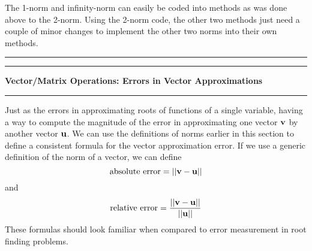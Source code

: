 \documentclass[10pt,fleqn]{article}
\begin{document}
The 1-norm and infinity-norm can easily be coded into methods as was done above
to the 2-norm. Using the 2-norm code, the other two methods just need a couple
of minor changes to implement the other two norms into their own methods.
\vskip0.1in\hrule\vskip0.1in
\newpage
\vskip0.1in\hrule\vskip0.1in
\noindent
{\bf Vector/Matrix Operations: Errors in Vector Approximations}
\vskip0.1in\hrule\vskip0.1in
\noindent
Just as the errors in approximating roots of functions of a single variable,
having a way to compute the magnitude of the error in approximating one vector
${\bf v}$ by another vector ${\bf u}$. We can use the definitions of norms
earlier in this section to define a consistent formula for the vector
approximation error. If we use a generic definition of the norm of a vector, we
can define
$$
  \makebox{absolute error} = || {\bf v} - {\bf u} ||
$$
and
$$
  \makebox{relative error} = {{|| {\bf v} - {\bf u} || }\over{ || {\bf u} || }}
$$
These formulas should look familiar when compared to error measurement in root
finding problems.
\end{document}
